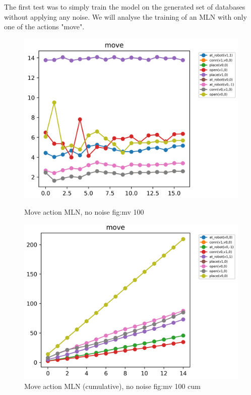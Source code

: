 The first test was to simply train the model on the generated set of databases without applying any noise.
We will analyse the training of an MLN with only one of the actions "move".
\begin{figure}[h]
 \centering
 \begin{minipage}[b]{0.49\linewidth}
 \includegraphics[width=1\textwidth]{images/tests/movegraph_100}
 \caption{Move action MLN, no noise {fig:mv 100}}

 \end{minipage}
 \hfill
 \begin{minipage}[b]{0.49\linewidth}

 \includegraphics[width=1\textwidth]{images/tests/movegraph_100_cum}
 \caption{Move action MLN (cumulative), no noise {fig:mv 100 cum}}

 \end{minipage}
\end{figure}

